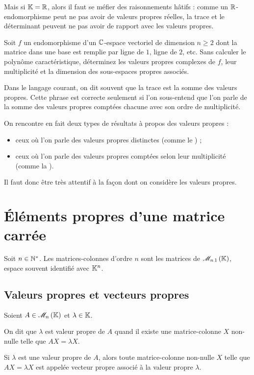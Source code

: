 Mais si \(\mathbb{K}=\mathbb{R}\), alors il faut se méfier des raisonnements hâtifs : comme un \(\mathbb{R}\)-endomorphisme peut ne pas avoir de valeurs propres réelles, la trace et le déterminant peuvent ne pas avoir de rapport avec les valeurs propres.

\begin{exo}
Soit \(f\) un endomorphisme d'un \(\mathbb{C}\)-espace vectoriel de dimension \(n\geq2\) dont la matrice dans une base est remplie par ligne de \(1\), ligne de \(2\), etc. Sans calculer le polynôme caractéristique, déterminez les valeurs propres complexes de \(f\), leur multiplicité et la dimension des sous-espaces propres associés.
\end{exo}

\begin{rem}
Dans le langage courant, on dit souvent que la trace est la somme des valeurs propres. Cette phrase est correcte seulement si l'on sous-entend que l'on parle de la somme des valeurs propres comptées chacune avec son ordre de multiplicité.

On rencontre en fait deux types de résultats à propos des valeurs propres :

\begin{itemize}
    \item ceux où l'on parle des valeurs propres distinctes (comme le ) ; \\
    \item ceux où l'on parle des valeurs propres comptées selon leur multiplicité (comme la ).
\end{itemize}

Il faut donc être très attentif à la façon dont on considère les valeurs propres.
\end{rem}

\section{Éléments propres d'une matrice carrée}

Soit \(n\in\mathbb{N}^*\). Les matrices-colonnes d'ordre \(n\) sont les matrices de \(\M{n\,1}\), espace souvent identifié avec \(\mathbb{K}^n\).

\subsection{Valeurs propres et vecteurs propres}

\begin{defi}
Soient \(A\in\M{n}\) et \(\lambda\in\mathbb{K}\).

On dit que \(\lambda\) est valeur propre de \(A\) quand il existe une matrice-colonne \(X\) non-nulle telle que \(AX=\lambda X\).

Si \(\lambda\) est une valeur propre de \(A\), alors toute matrice-colonne non-nulle \(X\) telle que \(AX=\lambda X\) est appelée vecteur propre associé à la valeur propre \(\lambda\).
\end{defi}

